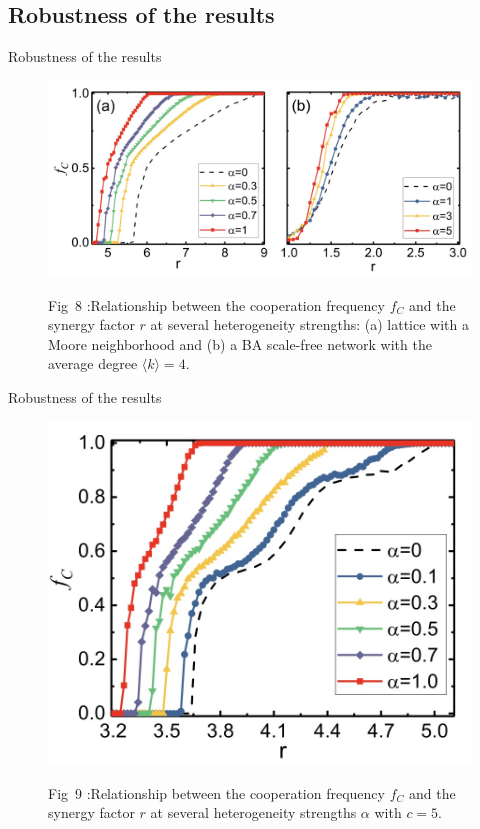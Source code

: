 \documentclass[notheorems,11pt,compress]{beamer}
\numberwithin{figure}{section}
\numberwithin{table}{section}
\numberwithin{equation}{section}
\theoremstyle{plain}
\numberwithin{theorem}{section}
\numberwithin{definition}{section}
\numberwithin{lemma}{section}
\numberwithin{proposition}{section}
\numberwithin{corollary}{section}
\theoremstyle{example}
\begin{document}
\subsection{Robustness of the results}
\begin{frame}{Robustness of the results}
	\begin{figure}[H]
		\centering
		\includegraphics[width=1\linewidth]{8}
		\label{fig8}
		\parbox{.8\textwidth}{\scriptsize Fig\ 8 :Relationship between the cooperation frequency $f_C$ and the synergy factor $r$ at several heterogeneity strengths: (a) lattice with a Moore neighborhood and (b) a BA scale-free network with the average degree $\langle k\rangle = 4$.
		}
	\end{figure}
\end{frame}


\begin{frame}{Robustness of the results}
	\begin{figure}[H]
		\centering
		\includegraphics[width=.7\linewidth]{9}
		\label{fig9}
		\parbox{.8\textwidth}{\scriptsize Fig\ 9 :Relationship between the cooperation frequency $f_C$ and the synergy factor $r$ at several heterogeneity strengths $\alpha$ with $c = 5$.

		}
	\end{figure}
\end{frame}
\end{document}
